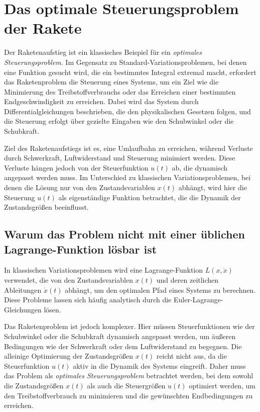 %
%
%
%

\section{Das optimale Steuerungsproblem der Rakete \label{leo:section:optimalsteuerung}}

Der Raketenaufstieg ist ein klassisches Beispiel für ein \textit{optimales Steuerungsproblem}. 
Im Gegensatz zu Standard-Variationsproblemen, bei denen eine Funktion gesucht wird, die ein bestimmtes Integral extremal macht, erfordert das Raketenproblem die Steuerung eines Systems, um ein Ziel wie die Minimierung des Treibstoffverbrauchs oder das Erreichen einer bestimmten Endgeschwindigkeit zu erreichen. Dabei wird das System durch Differentialgleichungen beschrieben, die den physikalischen Gesetzen folgen, und die Steuerung erfolgt über gezielte Eingaben wie den Schubwinkel oder die Schubkraft.

Ziel des Raketenaufstiegs ist es, eine Umlaufbahn zu erreichen, während Verluste durch Schwerkraft, Luftwiderstand und Steuerung minimiert werden. 
Diese Verluste hängen jedoch von der Steuerfunktion \( u(t) \) ab, die dynamisch angepasst werden muss. 
Im Unterschied zu klassischen Variationsproblemen, bei denen die Lösung nur von den Zustandsvariablen \( x(t) \) abhängt, wird hier die Steuerung \( u(t) \) als eigenständige Funktion betrachtet, die die Dynamik der Zustandsgrößen beeinflusst.

\subsection{Warum das Problem nicht mit einer üblichen Lagrange-Funktion lösbar ist}

In klassischen Variationsproblemen wird eine Lagrange-Funktion \(L(x, \dot{x})\) verwendet, die von den Zustandsvariablen \(x(t)\) und deren zeitlichen Ableitungen \(\dot{x}(t)\) abhängt, um den optimalen Pfad eines Systems zu berechnen. 
Diese Probleme lassen sich häufig analytisch durch die Euler-Lagrange-Gleichungen lösen.

Das Raketenproblem ist jedoch komplexer. 
Hier müssen Steuerfunktionen wie der Schubwinkel oder die Schubkraft dynamisch angepasst werden, um äußeren Bedingungen wie der Schwerkraft oder dem Luftwiderstand zu begegnen. 
Die alleinige Optimierung der Zustandsgrößen \(x(t)\) reicht nicht aus, da die Steuerfunktion \(u(t)\) aktiv in die Dynamik des Systems eingreift. 
Daher muss das Problem als \textit{optimales Steuerungsproblem} betrachtet werden, bei dem sowohl die Zustandsgrößen \(x(t)\) als auch die Steuergrößen \(u(t)\) optimiert werden, um den Treibstoffverbrauch zu minimieren und die gewünschten Endbedingungen zu erreichen.

